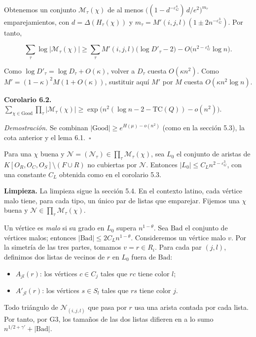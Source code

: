 \documentclass[spanish,11pt,a4paper]{article}
\providecommand{\tightlist}{\setlength{\itemsep}{0pt}\setlength{\parskip}{0pt}}
\begin{document}
Obtenemos un conjunto \(\mathcal M_\tau(\chi)\) de al menos \(\bigl((1-d^{-\varepsilon_G^4})\,d/e^2\bigr)^{m_\tau}\) emparejamientos, con \(d=\Delta(H_\tau(\chi))\) y \(m_\tau=M'(i,j,l)(1\pm2n^{-\varepsilon_G^3})\). Por tanto,

\nopagebreak[4]
\[\sum_\tau\log|\mathcal M_\tau(\chi)|\ge\sum_\tau M'(i,j,l)\bigl(\log D'_\tau-2\bigr)-O\bigl(n^{2-\varepsilon_G^4}\log n\bigr).\]

Como \(\log D'_\tau=\log D_\tau+O(\kappa)\), volver a \(D_\tau\) cuesta \(O(\kappa n^2)\). Como \(M'=(1-\kappa)^2M(1+O(\kappa))\), sustituir aquí \(M'\) por \(M\) cuesta \(O(\kappa n^2\log n)\).

\textbf{Corolario 6.2.} \(\displaystyle\sum_{\chi\in\mathrm{Good}}\prod_\tau|\mathcal M_\tau(\chi)|\ge\exp\bigl(n^2(\log n-2-\mathrm{TC}(Q))-o(n^2)\bigr)\).

\emph{Demostración.} Se combinan \(|\mathrm{Good}|\ge e^{H(\mu)-o(n^2)}\) (como en la sección 5.3), la cota anterior y el lema 6.1.~\(\square\)

Para una \(\chi\) buena y \(\mathcal N=(\mathcal N_\tau)\in\prod_\tau\mathcal M_\tau(\chi)\), sea \(L_0\) el conjunto de aristas de \(K[O_R,O_C,O_S]\setminus(F\cup R)\) no cubiertas por \(\mathcal N\). Entonces \(|L_0|\le C_Ln^{2-\varepsilon_G^3}\), con una constante \(C_L\) obtenida como en el corolario 5.3.

\textbf{Limpieza.} La limpieza sigue la sección 5.4. En el contexto latino, cada vértice malo tiene, para cada tipo, un único par de listas que emparejar. Fijemos una \(\chi\) buena y \(\mathcal N\in\prod_\tau\mathcal M_\tau(\chi)\).

Un vértice es \emph{malo} si su grado en \(L_0\) supera \(n^{1-\theta}\). Sea \(\mathrm{Bad}\) el conjunto de vértices malos; entonces \(|\mathrm{Bad}|\le2C_Ln^{1-\theta}\). Consideremos un vértice malo \(v\). Por la simetría de las tres partes, tomamos \(v=r\in R_i\). Para cada par \((j,l)\), definimos dos listas de vecinos de \(r\) en \(L_0\) fuera de \(\mathrm{Bad}\):

\begin{itemize}
\tightlist
\item
  \(A_{jl}(r)\): los vértices \(c\in C_j\) tales que \(rc\) tiene color \(l\);
\item
  \(A'_{jl}(r)\): los vértices \(s\in S_l\) tales que \(rs\) tiene color \(j\).
\end{itemize}

Todo triángulo de \(\mathcal N_{(i,j,l)}\) que pasa por \(r\) usa una arista contada por cada lista. Por tanto, por G3, los tamaños de las dos listas difieren en a lo sumo \(n^{1/2+\gamma'}+|\mathrm{Bad}|\).
\end{document}
